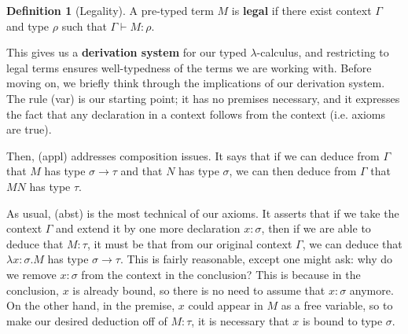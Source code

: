 \documentclass{article}
\theoremstyle{definition}
\newtheorem{definition} [theorem] {Definition}
\newcommand{\1}{\mathbb{1}}
\newcommand{\0}{\mathbb{0}}
\begin{document}
\begin{definition}[Legality]
A pre-typed term $M$ is \textbf{legal} if there exist context $\Gamma$ and type $\rho$ such that $\Gamma \vdash M : \rho$. 
\end{definition}

This gives us a \textbf{derivation system} for our typed $\lambda$-calculus, and restricting to legal terms ensures well-typedness of the terms we are working with. Before moving on, we briefly think through the implications of our derivation system. The rule (var) is our starting point; it has no premises necessary, and it expresses the fact that any declaration in a context follows from the context (i.e. axioms are true). 

Then, (appl) addresses composition issues. It says that if we can deduce from $\Gamma$ that $M$ has type $\sigma \to \tau$ and that $N$ has type $\sigma$, we can then deduce from $\Gamma$ that $MN$ has type $\tau$.

As usual, (abst) is the most technical of our axioms. It asserts that if we take the context $\Gamma$ and extend it by one more declaration $x : \sigma$, then if we are able to deduce that $M : \tau$, it must be that from our original context $\Gamma$, we can deduce that $\lambda x : \sigma . M$ has type $\sigma \to \tau$. This is fairly reasonable, except one might ask: why do we remove $x : \sigma$ from the context in the conclusion? This is because in the conclusion, $x$ is already bound, so there is no need to assume that $x : \sigma$ anymore. On the other hand, in the premise, $x$ could appear in $M$ as a free variable, so to make our desired deduction off of $M : \tau$, it is necessary that $x$ is bound to type $\sigma$. 
\end{document}
